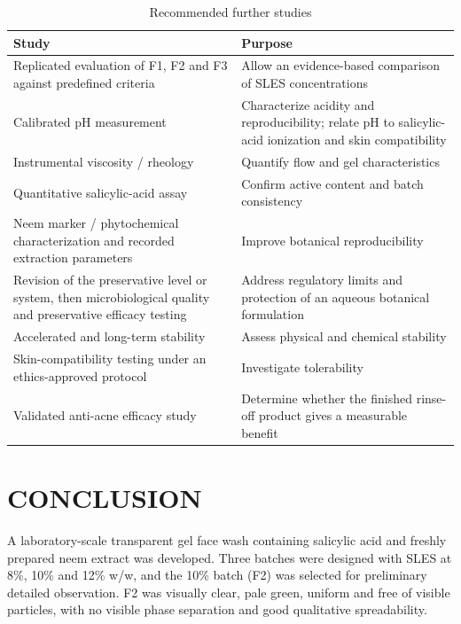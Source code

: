 \documentclass[10pt,a4paper,twocolumn]{article}
\begin{document}
\begin{table}[!htbp]
\centering

\renewcommand{\arraystretch}{1.3}
\begin{tabularx}{\textwidth}{XX}
\toprule
\textbf{Study} & \textbf{Purpose} \\
\midrule
Replicated evaluation of F1, F2 and F3 against predefined criteria
  & Allow an evidence-based comparison of SLES concentrations \\
Calibrated pH measurement
  & Characterize acidity and reproducibility; relate pH to
    salicylic-acid ionization and skin compatibility \\
Instrumental viscosity / rheology
  & Quantify flow and gel characteristics \\
Quantitative salicylic-acid assay
  & Confirm active content and batch consistency \\
Neem marker / phytochemical characterization and recorded extraction
parameters
  & Improve botanical reproducibility \\
Revision of the preservative level or system, then microbiological
quality and preservative efficacy testing
  & Address regulatory limits and protection of an aqueous botanical
    formulation \\
Accelerated and long-term stability
  & Assess physical and chemical stability \\
Skin-compatibility testing under an ethics-approved protocol
  & Investigate tolerability \\
Validated anti-acne efficacy study
  & Determine whether the finished rinse-off product gives a measurable
    benefit \\
\bottomrule
\end{tabularx}
\caption{Recommended further studies}
\label{tab:furtherwork}
\end{table}

\section{CONCLUSION}

A laboratory-scale transparent gel face wash containing salicylic acid
and freshly prepared neem extract was developed. Three batches were
designed with SLES at 8\%, 10\% and 12\% w/w, and the 10\% batch (F2)
was selected for preliminary detailed observation. F2 was visually
clear, pale green, uniform and free of visible particles, with no visible
phase separation and good qualitative spreadability.
\end{document}
